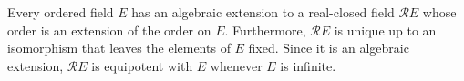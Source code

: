 Every ordered field $E$ has an algebraic extension to a real-closed field $\mathcal{R}E$ whose order is an extension of the order on $E$. Furthermore, $\mathcal{R}E$ is unique up to an isomorphism that leaves the elements of $E$ fixed. Since it is an algebraic extension, $\mathcal{R}E$ is equipotent with $E$ whenever $E$ is infinite.